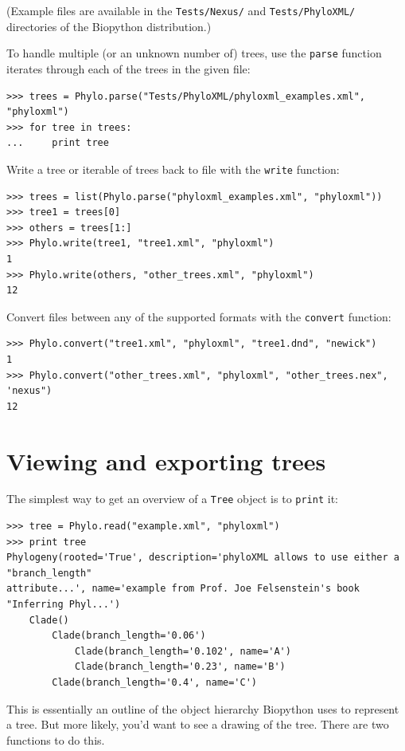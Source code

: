 \documentclass{report}
\begin{document}
(Example files are available in the \texttt{Tests/Nexus/} and \texttt{Tests/PhyloXML/}
directories of the Biopython distribution.)

To handle multiple (or an unknown number of) trees, use the \verb|parse| function iterates
through each of the trees in the given file: 

\begin{verbatim}
>>> trees = Phylo.parse("Tests/PhyloXML/phyloxml_examples.xml", "phyloxml")
>>> for tree in trees:
...     print tree
\end{verbatim}

Write a tree or iterable of trees back to file with the \verb|write| function:

\begin{verbatim}
>>> trees = list(Phylo.parse("phyloxml_examples.xml", "phyloxml"))
>>> tree1 = trees[0]
>>> others = trees[1:]
>>> Phylo.write(tree1, "tree1.xml", "phyloxml")
1
>>> Phylo.write(others, "other_trees.xml", "phyloxml")
12
\end{verbatim}

Convert files between any of the supported formats with the \verb|convert| function:

\begin{verbatim}
>>> Phylo.convert("tree1.xml", "phyloxml", "tree1.dnd", "newick")
1
>>> Phylo.convert("other_trees.xml", "phyloxml", "other_trees.nex", 'nexus")
12
\end{verbatim}


\section{Viewing and exporting trees}

The simplest way to get an overview of a \verb|Tree| object is to \verb|print| it:

\begin{verbatim}
>>> tree = Phylo.read("example.xml", "phyloxml")
>>> print tree
Phylogeny(rooted='True', description='phyloXML allows to use either a "branch_length"
attribute...', name='example from Prof. Joe Felsenstein's book "Inferring Phyl...')
    Clade()
        Clade(branch_length='0.06')
            Clade(branch_length='0.102', name='A')
            Clade(branch_length='0.23', name='B')
        Clade(branch_length='0.4', name='C')
\end{verbatim}

This is essentially an outline of the object hierarchy Biopython uses to represent a tree. But
more likely, you'd want to see a drawing of the tree. There are two functions to do this.
\end{document}
